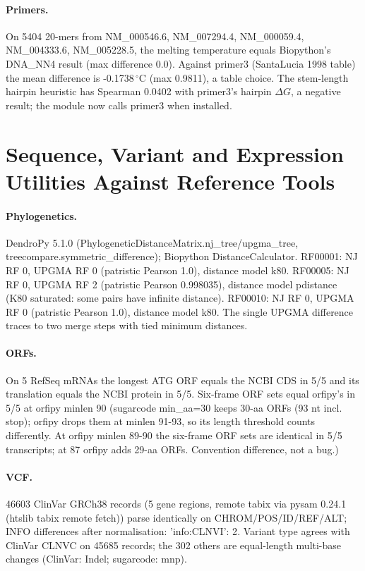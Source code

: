 \paragraph{Primers.} On 5404 20-mers from NM\_000546.6, NM\_007294.4, NM\_000059.4, NM\_004333.6, NM\_005228.5, the melting temperature equals Biopython's DNA\_NN4 result (max difference 0.0). Against primer3 (SantaLucia 1998 table) the mean difference is -0.1738\,$^\circ$C (max 0.9811), a table choice. The stem-length hairpin heuristic has Spearman 0.0402 with primer3's hairpin $\Delta G$, a negative result; the module now calls primer3 when installed.
\section{Sequence, Variant and Expression Utilities Against Reference Tools}
\paragraph{Phylogenetics.} DendroPy 5.1.0 (PhylogeneticDistanceMatrix.nj\_tree/upgma\_tree, treecompare.symmetric\_difference); Biopython DistanceCalculator. RF00001: NJ RF 0, UPGMA RF 0 (patristic Pearson 1.0), distance model k80. RF00005: NJ RF 0, UPGMA RF 2 (patristic Pearson 0.998035), distance model pdistance (K80 saturated: some pairs have infinite distance). RF00010: NJ RF 0, UPGMA RF 0 (patristic Pearson 1.0), distance model k80. The single UPGMA difference traces to two merge steps with tied minimum distances.
\paragraph{ORFs.} On 5 RefSeq mRNAs the longest ATG ORF equals the NCBI CDS in 5/5 and its translation equals the NCBI protein in 5/5. Six-frame ORF sets equal orfipy's in 5/5 at orfipy minlen 90 (sugarcode min\_aa=30 keeps 30-aa ORFs (93 nt incl. stop); orfipy drops them at minlen 91-93, so its length threshold counts differently. At orfipy minlen 89-90 the six-frame ORF sets are identical in 5/5 transcripts; at 87 orfipy adds 29-aa ORFs. Convention difference, not a bug.)
\paragraph{VCF.} 46603 ClinVar GRCh38 records (5 gene regions, remote tabix via pysam 0.24.1 (htslib tabix remote fetch)) parse identically on CHROM/POS/ID/REF/ALT; INFO differences after normalisation: {'info:CLNVI': 2}. Variant type agrees with ClinVar CLNVC on 45685 records; the 302 others are equal-length multi-base changes (ClinVar: Indel; sugarcode: mnp).
